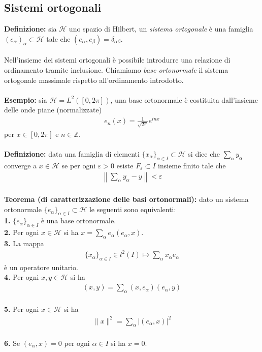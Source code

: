 \documentclass{article}
\numberwithin{equation}{subsection}
\begin{document}
\subsection{Sistemi ortogonali}
\textbf{Definizione:} sia $\mathcal{H}$ uno spazio di Hilbert, un \textit{sistema ortogonale} è una famiglia $(e_\alpha)_{\alpha} \subset \mathcal{H}$ tale che $(e_\alpha, e_\beta) = \delta_{\alpha\beta}$. \\ \\
Nell'insieme dei sistemi ortogonali è possibile introdurre una relazione di ordinamento tramite inclusione. Chiamiamo \textit{base ortonormale} il sistema ortogonale massimale rispetto all'ordinamento introdotto. \\ \\
\textbf{Esempio:} sia $\mathcal{H} = L^2([0, 2\pi])$, una base ortonormale è costituita dall'insieme delle onde piane (normalizzate)
\begin{align*}
    e_n(x) = \frac{1}{\sqrt{2\pi}}e^{inx} 
\end{align*}
per $x \in [0, 2\pi]$ e $n \in \mathbb{Z}$. \\ \\
\textbf{Definizione:} data una famiglia di elementi $\{x_\alpha\}_{\alpha \in I} \subset \mathcal{H}$ si dice che $\sum_\alpha y_\alpha$ converge a $x \in \mathcal{H}$ se per ogni $\varepsilon > 0$ esiste $F_\varepsilon \subset I$ insieme finito tale che
\begin{align*}
    \left\|\sum_\alpha y_\alpha - y\right\| < \varepsilon 
\end{align*} \\
\textbf{Teorema (di caratterizzazione delle basi ortonormali):} dato un sistema ortonormale $\{e_\alpha\}_{\alpha \in I} \subset \mathcal{H}$ le seguenti sono equivalenti: \\
\textbf{1.} $\{e_\alpha\}_{\alpha \in I}$ è una base ortonormale. \\
\textbf{2.} Per ogni $x \in \mathcal{H}$ si ha $x = \sum_\alpha e_\alpha(e_\alpha, x)$. \\
\textbf{3.} La mappa 
\begin{align*}
    \{x_\alpha\}_{\alpha \in I} \in l^2(I) \mapsto \sum_{\alpha}x_\alpha e_\alpha 
\end{align*}
è un operatore unitario. \\
\textbf{4.} Per ogni $x, y \in \mathcal{H}$ si ha 
\begin{align*}
    (x, y) = \sum_{\alpha}(x, e_\alpha)(e_\alpha, y) 
\end{align*} \\
\textbf{5.} Per ogni $x \in \mathcal{H}$ si ha 
\begin{align*}
    \|x\|^2 = \sum_{\alpha}|(e_\alpha, x)|^2 
\end{align*} \\
\textbf{6.} Se $(e_\alpha, x) = 0$ per ogni $\alpha \in I$ si ha $x = 0$. \\
\end{document}
